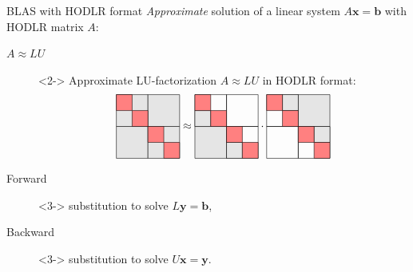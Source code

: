 \documentclass[aspectratio=169,xcolor=dvipsnames]{beamer}
\begin{document}
\begin{frame}{BLAS with HODLR format}
\emph{Approximate} solution of a linear system $A \mathbf{x} = \mathbf{b}$ with HODLR matrix $A$:
\begin{description}
	\item[$A \approx LU$]<2-> Approximate LU-factorization $A \approx LU$ in HODLR format:
\[
\vcenter{\hbox{\begin{tikzpicture}
			\draw[fill=gray!20,draw=black] (0,0) rectangle (1,1);
			\draw[fill=gray!20,draw=black] (1,0) rectangle (2,1);
			\draw[fill=gray!20,draw=black] (0,-1) rectangle (1,0);
			\draw[fill=gray!20,draw=black] (1,-1) rectangle (2,0);
			\draw[fill=red!50,draw=black] (0,0.5) rectangle (0.5,1);
			\draw[fill=red!50,draw=black] (0.5,0) rectangle (1,0.5);
			\draw[fill=red!50,draw=black] (1,-0.5) rectangle (1.5,0);
			\draw[fill=red!50,draw=black] (1.5,-1) rectangle (2,-0.5);
\end{tikzpicture}}} \approx 		\vcenter{\hbox{\begin{tikzpicture}
\draw[draw=black] (0,0) rectangle (1,1);
\draw[draw=black] (1,0) rectangle (2,1);
\draw[fill=gray!20,draw=black] (0,-1) rectangle (1,0);
\draw[draw=black] (1,-1) rectangle (2,0);
\draw[fill=gray!20,draw=black] (0,0) rectangle (0.5,0.5);
\draw[fill=gray!20,draw=black] (1,-1) rectangle (1.5,-0.5);
\draw[fill=red!50,draw=black] (0,0.5) rectangle (0.5,1);
\draw[fill=red!50,draw=black] (0.5,0) rectangle (1,0.5);
\draw[fill=red!50,draw=black] (1,-0.5) rectangle (1.5,0);
\draw[fill=red!50,draw=black] (1.5,-1) rectangle (2,-0.5);
\end{tikzpicture}}} \cdot 		\vcenter{\hbox{\begin{tikzpicture}
\draw[draw=black] (0,0) rectangle (1,1);
\draw[fill=gray!20,draw=black] (1,0) rectangle (2,1);
\draw[draw=black] (0,-1) rectangle (1,0);
\draw[draw=black] (1,-1) rectangle (2,0);
\draw[fill=gray!20,draw=black] (0.5,0.5) rectangle (1,1);
\draw[fill=gray!20,draw=black] (1.5,-0.5) rectangle (2,0);
\draw[fill=red!50,draw=black] (0,0.5) rectangle (0.5,1);
\draw[fill=red!50,draw=black] (0.5,0) rectangle (1,0.5);
\draw[fill=red!50,draw=black] (1,-0.5) rectangle (1.5,0);
\draw[fill=red!50,draw=black] (1.5,-1) rectangle (2,-0.5);
\end{tikzpicture}}}
\]	
	\item[Forward]<3-> substitution to solve $L\mathbf{y} = \mathbf{b}$,
	\item[Backward]<3-> substitution to solve $U \mathbf{x} = \mathbf{y}$.
\end{description}


\end{frame}
\end{document}
